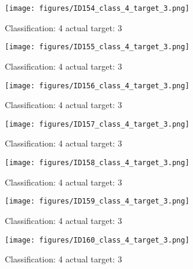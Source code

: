 \begin{figure}[h!]
\begin{center}
\texttt{[image: figures/ID154\_class\_4\_target\_3.png]}
\end{center}
\caption{ Classification: 4 actual target: 3}
\label{fig:ID154_class_4_target_3}
\end{figure}
\begin{figure}[h!]
\begin{center}
\texttt{[image: figures/ID155\_class\_4\_target\_3.png]}
\end{center}
\caption{ Classification: 4 actual target: 3}
\label{fig:ID155_class_4_target_3}
\end{figure}
\begin{figure}[h!]
\begin{center}
\texttt{[image: figures/ID156\_class\_4\_target\_3.png]}
\end{center}
\caption{ Classification: 4 actual target: 3}
\label{fig:ID156_class_4_target_3}
\end{figure}
\begin{figure}[h!]
\begin{center}
\texttt{[image: figures/ID157\_class\_4\_target\_3.png]}
\end{center}
\caption{ Classification: 4 actual target: 3}
\label{fig:ID157_class_4_target_3}
\end{figure}
\begin{figure}[h!]
\begin{center}
\texttt{[image: figures/ID158\_class\_4\_target\_3.png]}
\end{center}
\caption{ Classification: 4 actual target: 3}
\label{fig:ID158_class_4_target_3}
\end{figure}
\begin{figure}[h!]
\begin{center}
\texttt{[image: figures/ID159\_class\_4\_target\_3.png]}
\end{center}
\caption{ Classification: 4 actual target: 3}
\label{fig:ID159_class_4_target_3}
\end{figure}
\begin{figure}[h!]
\begin{center}
\texttt{[image: figures/ID160\_class\_4\_target\_3.png]}
\end{center}
\caption{ Classification: 4 actual target: 3}
\label{fig:ID160_class_4_target_3}
\end{figure}
